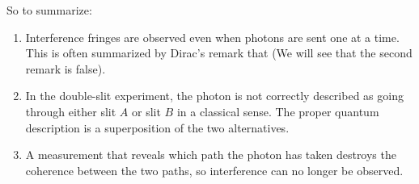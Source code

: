 So to summarize:
\begin{enumerate}
    \item Interference fringes are observed even when photons are sent one at a time. This is often summarized by Dirac's remark that  (We will see that the second remark is false).
    \item In the double-slit experiment, the photon is not correctly described as going through either slit $A$ or slit $B$ in a classical sense. The proper quantum description is a superposition of the two alternatives.
    \item A measurement that reveals which path the photon has taken destroys the coherence between the two paths, so interference can no longer be observed.
\end{enumerate}